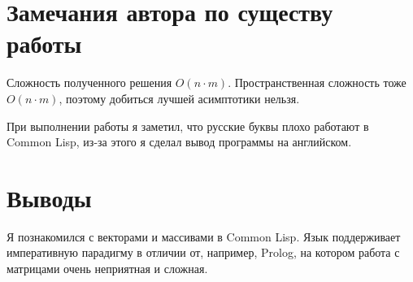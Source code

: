 \documentclass[12pt]{article}
\begin{document}
\section{Замечания автора по существу работы}

Сложность полученного решения $O(n \cdot m)$. Пространственная сложность тоже $O(n \cdot m)$, поэтому добиться лучшей асимптотики нельзя.

При выполнении работы я заметил, что русские буквы плохо работают в Common Lisp, из-за этого я сделал вывод программы на английском.

\section{Выводы}
Я познакомился с векторами и массивами в Common Lisp. Язык поддерживает императивную парадигму в отличии от, например, Prolog, на котором работа с матрицами очень неприятная и сложная.
\end{document}
